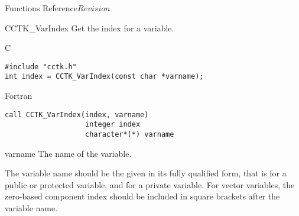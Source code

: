 \begin{cactuspart}{ Functions Reference}{}{$Revision$}
\begin{FunctionDescription}{CCTK\_VarIndex}{}
\label{CCTK-VarIndex}
Get the index for a variable.
\begin{SynopsisSection}
\begin{Synopsis}{C}
\begin{verbatim}
#include "cctk.h"
int index = CCTK_VarIndex(const char *varname);
\end{verbatim}
\end{Synopsis}
\begin{Synopsis}{Fortran}
\begin{verbatim}
call CCTK_VarIndex(index, varname)
                   integer index
                   character*(*) varname
\end{verbatim}
\end{Synopsis}
\end{SynopsisSection}

\begin{ParameterSection}
\begin{Parameter}{varname}
The name of the variable.
\end{Parameter}
\end{ParameterSection}

\begin{Discussion}
The variable name should be the given in its fully qualified form,
that is  for a public or protected
variable, and  for a private variable.
For vector variables, the zero-based component index should be included
in square brackets after the variable name.
\end{Discussion}


\end{FunctionDescription}
\end{cactuspart}
